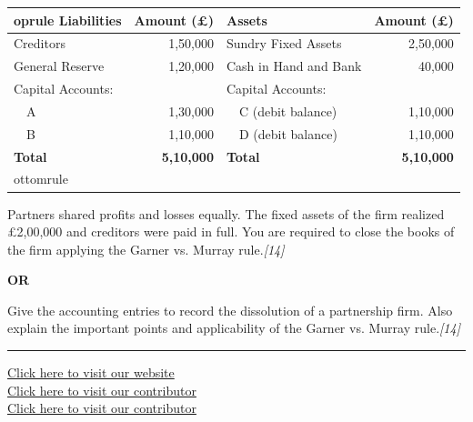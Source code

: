\documentclass[11pt,a4paper]{article}
\newcommand{\pts}[1]{\hfill   \textit{[#1]}}
\begin{document}
\begin{center}

\begin{tabular}{lr|lr}
 oprule
   \textbf{Liabilities} &   \textbf{Amount (\pounds)} &   \textbf{Assets} &   \textbf{Amount (\pounds)} \\
\midrule
Creditors & 1,50,000 & Sundry Fixed Assets & 2,50,000 \\
General Reserve & 1,20,000 & Cash in Hand and Bank & 40,000 \\
Capital Accounts: & & Capital Accounts: & \\
~~A & 1,30,000 & ~~C (debit balance) & 1,10,000 \\
~~B & 1,10,000 & ~~D (debit balance) & 1,10,000 \\
\midrule
   \textbf{Total} &   \textbf{5,10,000} &   \textbf{Total} &   \textbf{5,10,000} \\
ottomrule
\end{tabular}
\end{center}




\noindent Partners shared profits and losses equally. The fixed assets of the firm realized \pounds 2,00,000 and creditors were paid in full. You are required to close the books of the firm applying the Garner vs. Murray rule.\pts{14}

\centerline{   \textbf{OR}}

Give the accounting entries to record the dissolution of a partnership firm. Also explain the important points and applicability of the Garner vs. Murray rule.\pts{14}

\vfill
\rule{\linewidth}{0.4pt}

\begin{center}\small
\href{https://bhu-exam.vercel.app/}{Click here to visit our website}\\[4pt]
\href{https://me-aryan.vercel.app/}{Click here to visit our contributor}\\[4pt]
\href{https://quashan-me.vercel.app/}{Click here to visit our contributor}
\end{center}
\end{document}
